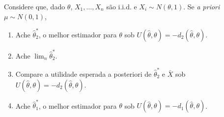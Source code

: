 \begin{exercise}
 Considere que, dado $\theta$, 
 $X_{1},\ldots,X_{n}$ são i.i.d. e
 $X_{i} \sim N(\theta,1)$. 
 Se \emph{a priori} $\mu \sim N(0,1)$,
 \begin{enumerate}[label=(\alph*)]
  \item Ache $\hat{\theta}^{*}_{2}$, 
  o melhor estimador para $\theta$ sob 
  $U(\hat{\theta},\theta)=-d_{2}(\hat{\theta},\theta)$.
  \item Ache $\lim_{n}\hat{\theta}^{*}_{2}$.
  \item Compare a utilidade esperada a posteriori 
  de $\hat{\theta}^{*}_{2}$ e $\bar{X}$ sob
  $U(\hat{\theta},\theta)=-d_{2}(\hat{\theta},\theta)$.
  \item Ache $\hat{\theta}^{*}_{1}$, 
  o melhor estimador para $\theta$ sob 
  $U(\hat{\theta},\theta)=-d_{1}(\hat{\theta},\theta)$.
 \end{enumerate}
\end{exercise}

